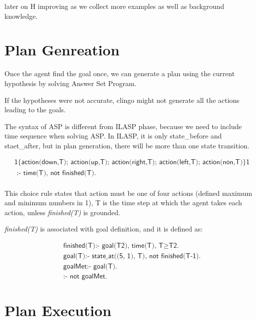 later on H improving as we collect more examples as well as background knowledge.

\section{Plan Genreation}
\label{Plan_genreation}

Once the agent find the goal once, we can generate a plan using the current hypothesis by solving Answer Set Program.

If the hypotheses were not accurate, clingo might not generate all the actions leading to the goals.

The syntax of ASP is different from ILASP phase, because we need to include time sequence when solving ASP.
In ILASP, it is only state\_before and staet\_after, but in plan generation, there will be more than one state transition.

\begin{equation}
\begin{split}
&\textsf{1\{action(down,T); action(up,T); action(right,T); action(left,T); action(non,T)\}1} \\
&\textsf{ :- time(T), not finished(T).}\\
\end{split}
\end{equation}

This choice rule states that action must be one of four actions (defined maximum and minimum numbers in 1),
T is the time step at which the agent takes each action, unless \textit{finished(T)} is grounded.

\textit{finished(T)} is associated with goal definition, and it is defined as:

\begin{equation}
\begin{split}
&\textsf{finished(T):- goal(T2), time(T), T} \geq \textsf{T2.}\\
&\textsf{goal(T):- state\_at((5, 1), T), not finished(T-1).}\\
&\textsf{goalMet:- goal(T).}\\
&\textsf{:- not goalMet.}
\end{split}
\end{equation}

\section{Plan Execution}
\label{Plan execution}

